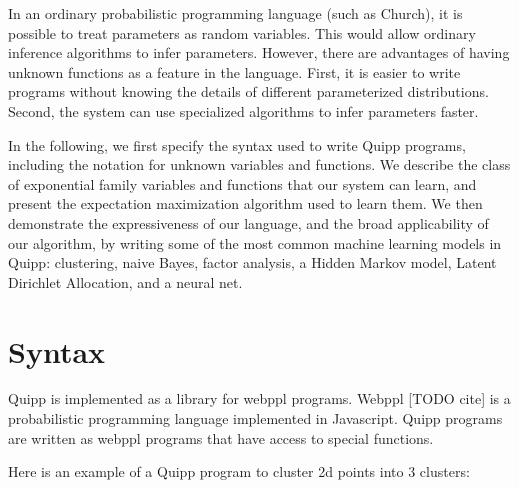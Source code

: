 \documentclass{article}
\begin{document}

  In an ordinary probabilistic programming language (such as Church),
  it is possible to treat parameters as random variables.  This
  would allow ordinary inference algorithms to infer parameters.  However,
  there are advantages of having unknown functions as a feature
  in the language.
  First, it is easier to
  write programs without knowing the details of different parameterized distributions.
  Second, the system can use specialized algorithms to infer parameters faster.



  In the following, we first specify the syntax used to write Quipp programs,
  including the notation for unknown variables and functions.
  We describe the class of exponential family variables and functions that our system can learn,
  and present the expectation maximization algorithm used to learn them.
  We then demonstrate the expressiveness of our language, and the broad
  applicability of our algorithm, by writing some of the most common machine learning models
  in Quipp: clustering, naive Bayes, factor analysis, a Hidden Markov model, Latent Dirichlet Allocation, and
  a neural net.
  
  \section{Syntax}

  Quipp is implemented as a library for webppl programs.  Webppl [TODO cite] is a probabilistic programming language
  implemented in Javascript. Quipp programs are written as webppl programs that have access to special functions.

  Here is an example of a Quipp program to cluster 2d points into 3 clusters:
\end{document}

